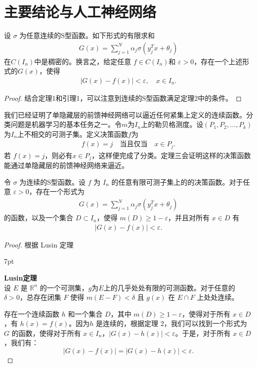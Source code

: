 \documentclass[12pt]{article}
\newenvironment{formal}{%
\def\FrameCommand{%
\hspace{1pt}%
{\color{Blue}\vrule width 2pt}%
{\color{formalshade}\vrule width 4pt}%
\colorbox{formalshade}%
}%
\MakeFramed{\advance\hsize-\width\FrameRestore}%
\noindent\hspace{-4.55pt}%
\begin{adjustwidth}{}{7pt}%
\vspace{2pt}\vspace{2pt}%
}
{%
\vspace{2pt}\end{adjustwidth}\endMakeFramed%
}
\begin{document}
\section{主要结论与人工神经网络}

\begin{mytheorem}
    设  $\sigma$ 为任意连续的S型函数。如下形式的有限求和
\begin{align*}
G(x) = \sum_{j=1}^{N} \alpha_j \sigma(y_j^T x + \theta_j)
\end{align*}
在$C(I_n)$中是稠密的。换言之，给定任意 $f \in C(I_n)$和 $\varepsilon > 0$，存在一个上述形式的$G(x)$，使得
\begin{align*}
|G(x) - f(x)| < \varepsilon, \quad x \in I_n.
\end{align*}
\end{mytheorem}

\begin{proof}
    结合定理1和引理1，可以注意到连续的S型函数满足定理2中的条件。
\end{proof}

我们已经证明了单隐藏层的前馈神经网络可以逼近任何紧集上定义的连续函数。分类问题是机器学习的基本任务之一。令$m$为$I_n$上的勒贝格测度。设$( P_1, P_2, \dots, P_k )$为$I_n$上不相交的可测子集。定义决策函数$f$为
\begin{align*}
    f(x)=j\quad \text{当且仅当} \quad x\in P_j.
\end{align*}
若 $f(x) = j$，则必有$x \in P_j$，这样便完成了分类。定理三会证明这样的决策函数能通过单隐藏层的前馈神经网络来逼近。
\begin{mytheorem}
    令 $\sigma$ 为连续的S型函数。设 $f$ 为 $I_n$ 的任意有限可测子集上的的决策函数。对于任意 $\varepsilon > 0$，存在一个形式为
\begin{align*}
G(x) = \sum_{j=1}^{N} \alpha_j \sigma(y_j^T x + \theta_j)
\end{align*}
的函数，以及一个集合 $D \subset I_n$，使得 $m(D) \geq 1 - \varepsilon$，并且对所有 $x \in D$ 有
\begin{align*}
|G(x) - f(x)| < \varepsilon.
\end{align*}
\end{mytheorem}

\begin{proof}
根据 Lusin 定理
\begin{formal}
    \textbf{Lusin定理}\\
    设 $E$ 是 $\mathbb{R}^n$ 的一个可测集，$g$为$E$上的几乎处处有限的可测函数。对于任意的 \( \delta > 0 \)，总存在闭集 $F$ 使得 $m(E - F) < \delta$ 且 $ g(x) $ 在 $ E\cap F $ 上处处连续。
\end{formal}
存在一个连续函数 $h$  和一个集合  $D$，其中  $m(D) \geq 1 - \varepsilon$，使得对于所有  $x \in D$，有 $h(x) = f(x)$。因为$h$ 是连续的，根据定理 2，我们可以找到一个形式为  $G$ 的函数，使得对于所有 $x \in I_n$，$|G(x) - h(x)| < \varepsilon$。于是，对于所有 $x \in D$，我们有：
$$
|G(x) - f(x)| = |G(x) - h(x)| < \varepsilon.$$
\end{proof}
\end{document}
